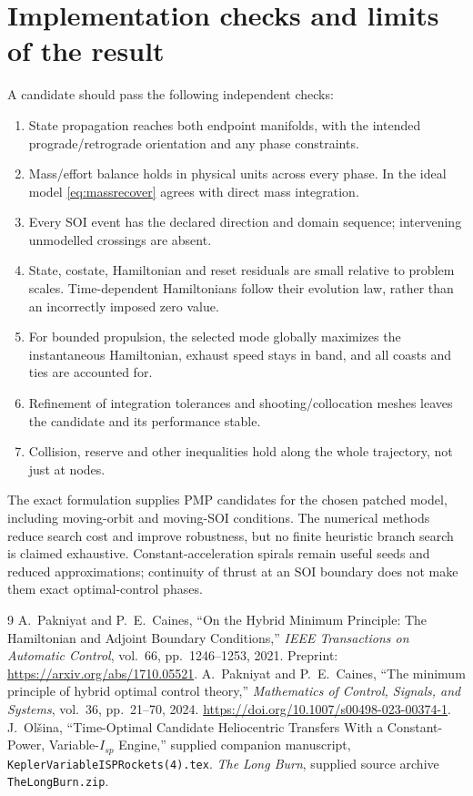 \documentclass[journal, a4paper]{IEEEtran}
\begin{document}
\section{Implementation checks and limits of the result}
A candidate should pass the following independent checks:
\begin{enumerate}
\item State propagation reaches both endpoint manifolds, with the intended prograde/retrograde orientation and any phase constraints.
\item Mass/effort balance holds in physical units across every phase. In the ideal model \eqref{eq:massrecover} agrees with direct mass integration.
\item Every SOI event has the declared direction and domain sequence; intervening unmodelled crossings are absent.
\item State, costate, Hamiltonian and reset residuals are small relative to problem scales. Time-dependent Hamiltonians follow their evolution law, rather than an incorrectly imposed zero value.
\item For bounded propulsion, the selected mode globally maximizes the instantaneous Hamiltonian, exhaust speed stays in band, and all coasts and ties are accounted for.
\item Refinement of integration tolerances and shooting/collocation meshes leaves the candidate and its performance stable.
\item Collision, reserve and other inequalities hold along the whole trajectory, not just at nodes.
\end{enumerate}
The exact formulation supplies PMP candidates for the chosen patched model, including moving-orbit and moving-SOI conditions. The numerical methods reduce search cost and improve robustness, but no finite heuristic branch search is claimed exhaustive. Constant-acceleration spirals remain useful seeds and reduced approximations; continuity of thrust at an SOI boundary does not make them exact optimal-control phases.

\begin{thebibliography}{9}
A.~Pakniyat and P.~E.~Caines, ``On the Hybrid Minimum Principle: The Hamiltonian and Adjoint Boundary Conditions,'' \emph{IEEE Transactions on Automatic Control}, vol.~66, pp.~1246--1253, 2021. Preprint: \url{https://arxiv.org/abs/1710.05521}.
A.~Pakniyat and P.~E.~Caines, ``The minimum principle of hybrid optimal control theory,'' \emph{Mathematics of Control, Signals, and Systems}, vol.~36, pp.~21--70, 2024. \url{https://doi.org/10.1007/s00498-023-00374-1}.
J.~Ol\v{s}ina, ``Time-Optimal Candidate Heliocentric Transfers With a Constant-Power, Variable-$I_{\!sp}$ Engine,'' supplied companion manuscript, \texttt{KeplerVariableISPRockets(4).tex}.
\emph{The Long Burn}, supplied source archive \texttt{TheLongBurn.zip}.
\end{thebibliography}
\end{document}
